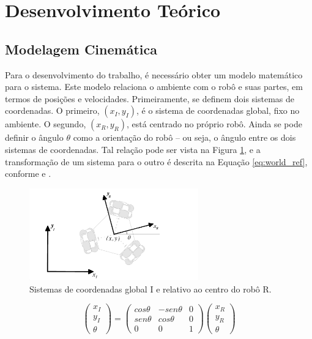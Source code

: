\section{Desenvolvimento Teórico}
\label{sec:teorico}

\subsection{Modelagem Cinemática}

Para o desenvolvimento do trabalho, é necessário obter um modelo matemático para o sistema. Este modelo relaciona o ambiente com o robô e suas partes, em termos de posições e velocidades. Primeiramente, se definem dois sistemas de coordenadas. O primeiro, $(x_I,y_I)$, é o sistema de coordenadas global, fixo no ambiente. O segundo, $(x_R,y_R)$, está centrado no próprio robô. Ainda se pode definir o ângulo $\theta$ como a orientação do robô -- ou seja, o ângulo entre os dois sistemas de coordenadas. Tal relação pode ser vista na Figura \ref{fig:ref}, e a transformação de um sistema para o outro é descrita na Equação \ref{eq:world_ref}, conforme \citet{siegwart2011introduction} e \citet{ritter2016modelagem}.

\begin{figure}[h]
  \centering
  \includegraphics[width = 0.65\textwidth]{imagens/ref}
  \caption{Sistemas de coordenadas global I e relativo ao centro do robô R.}
  \label{fig:ref}
\end{figure}

\begin{equation}
  \begin{pmatrix}
    x_I \\
    y_I \\
    \theta
  \end{pmatrix}
  =
  \begin{pmatrix}
    cos \theta & -sen \theta & 0 \\
    sen\theta  &  cos \theta & 0 \\
    0          & 0          & 1
  \end{pmatrix}
  \begin{pmatrix}
    x_R \\
    y_R \\
    \theta
  \end{pmatrix}
  \label{eq:world_ref}
\end{equation}


